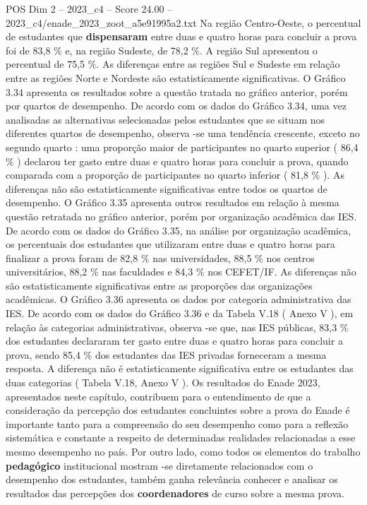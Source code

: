 \begin{textsample}{POS Dim 2 – 2023\_c4 – Score 24.00 – 2023\_c4/enade\_2023\_zoot\_a5e91995a2.txt}
Na região Centro-Oeste, o percentual de estudantes que \textbf{dispensaram} entre duas e quatro horas para concluir a prova foi de 83,8 \% e, na região Sudeste, de 78,2 \%.
A região Sul apresentou o percentual de 75,5 \%.
As diferenças entre as regiões Sul e Sudeste em relação entre as regiões Norte e Nordeste são estatisticamente significativas.
O Gráfico 3.34 apresenta os resultados sobre a questão tratada no gráfico anterior, porém por quartos de desempenho.
De acordo com os dados do Gráfico 3.34, uma vez analisadas as alternativas selecionadas pelos estudantes que se situam nos diferentes quartos de desempenho, observa -se uma tendência crescente, exceto no segundo quarto : uma proporção maior de participantes no quarto superior ( 86,4 \% ) declarou ter gasto entre duas e quatro horas para concluir a prova, quando comparada com a proporção de participantes no quarto inferior ( 81,8 \% ).
As diferenças não são estatisticamente significativas entre todos os quartos de desempenho.
O Gráfico 3.35 apresenta outros resultados em relação à mesma questão retratada no gráfico anterior, porém por organização acadêmica das IES.
De acordo com os dados do Gráfico 3.35, na análise por organização acadêmica, os percentuais dos estudantes que utilizaram entre duas e quatro horas para finalizar a prova foram de 82,8 \% nas universidades, 88,5 \% nos centros universitários, 88,2 \% nas faculdades e 84,3 \% nos CEFET/IF.
As diferenças não são estatisticamente significativas entre as proporções das organizações acadêmicas.
O Gráfico 3.36 apresenta os dados por categoria administrativa das IES.
De acordo com os dados do Gráfico 3.36 e da Tabela V.18 ( Anexo V ), em relação às categorias administrativas, observa -se que, nas IES públicas, 83,3 \% dos estudantes declararam ter gasto entre duas e quatro horas para concluir a prova, sendo 85,4 \% dos estudantes das IES privadas forneceram a mesma resposta.
A diferença não é estatisticamente significativa entre os estudantes das duas categorias ( Tabela V.18, Anexo V ).
Os resultados do Enade 2023, apresentados neste capítulo, contribuem para o entendimento de que a consideração da percepção dos estudantes concluintes sobre a prova do Enade é importante tanto para a compreensão do seu desempenho como para a reflexão sistemática e constante a respeito de determinadas realidades relacionadas a esse mesmo desempenho no país.
Por outro lado, como todos os elementos do trabalho \textbf{pedagógico} institucional mostram -se diretamente relacionados com o desempenho dos estudantes, também ganha relevância conhecer e analisar os resultados das percepções dos \textbf{coordenadores} de curso sobre a mesma prova.

\end{textsample}
